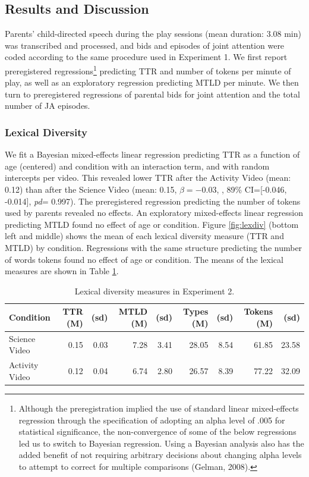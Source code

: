 \documentclass[man,floatsintext]{apa6}
\begin{document}
\hypertarget{results-and-discussion-1}{%
\subsection{Results and Discussion}\label{results-and-discussion-1}}

Parents' child-directed speech during the play sessions (mean duration: 3.08 min) was transcribed and processed, and bids and episodes of joint attention were coded according to the same procedure used in Experiment 1.
We first report preregistered regressions\footnote{Although the preregistration implied the use of standard linear mixed-effects regression through the specification of adopting an alpha level of .005 for statistical significance, the non-convergence of some of the below regressions led us to switch to Bayesian regression. Using a Bayesian analysis also has the added benefit of not requiring arbitrary decisions about changing alpha levels to attempt to correct for multiple comparisons (Gelman, 2008).} predicting TTR and number of tokens per minute of play, as well as an exploratory regression predicting MTLD per minute.
We then turn to preregistered regressions of parental bids for joint attention and the total number of JA episodes.

\hypertarget{lexical-diversity-1}{%
\subsubsection{Lexical Diversity}\label{lexical-diversity-1}}

We fit a Bayesian mixed-effects linear regression predicting TTR as a function of age (centered) and condition with an interaction term, and with random intercepts per video.
This revealed lower TTR after the Activity Video (mean: 0.12) than after the Science Video (mean: 0.15, \(\beta=-0.03\), , 89\% CI={[}-0.046, -0.014{]}, \emph{pd}= 0.997).
The preregistered regression predicting the number of tokens used by parents revealed no effects.
An exploratory mixed-effects linear regression predicting MTLD found no effect of age or condition.
Figure \ref{fig:lexdiv} (bottom left and middle) shows the mean of each lexical diversity measure (TTR and MTLD) by condition.
Regressions with the same structure predicting the number of words tokens found no effect of age or condition.
The means of the lexical measures are shown in Table \ref{e2tab}.

\begin{table}

\caption{\label{tab:e2tab}\label{e2tab} Lexical diversity measures in Experiment 2.}
\centering
\begin{tabular}[t]{l|r|r|r|r|r|r|r|r}
\hline
Condition & TTR (M) & (sd) & MTLD (M) & (sd) & Types (M) & (sd) & Tokens (M) & (sd)\\
\hline
Science Video & 0.15 & 0.03 & 7.28 & 3.41 & 28.05 & 8.54 & 61.85 & 23.58\\
\hline
Activity Video & 0.12 & 0.04 & 6.74 & 2.80 & 26.57 & 8.39 & 77.22 & 32.09\\
\hline
\end{tabular}
\end{table}
\end{document}
